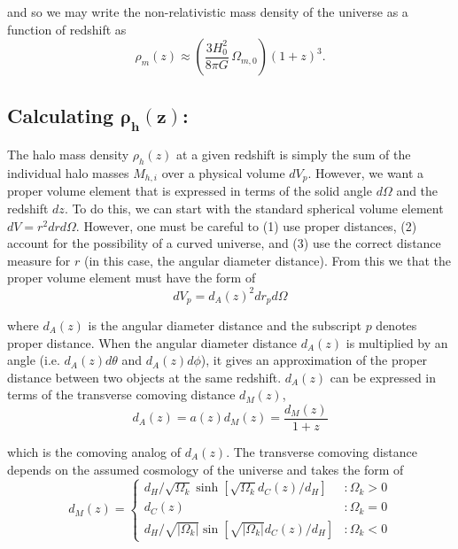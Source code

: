 \documentclass[%
 reprint,
 amsmath,amssymb,
 aps,nofootinbib
]{revtex4-1}
\begin{document}
\noindent and so we may write the non-relativistic mass density of the universe as a function of redshift as
\begin{equation}\label{rho}
\rho_m(z)\approx\left(\frac{3H_0^2}{8\pi G}\,\Omega_{m,0}\right)(1+z)^3.
\end{equation}

\subsection*{Calculating $\mathbf{\rho_h(z)}$:}

The halo mass density $\rho_h(z)$ at a given redshift is simply the sum of the individual halo masses $M_{h,i}$ over a physical volume $dV_p$. However, we want a proper volume element that is expressed in terms of the solid angle $d\Omega$ and the redshift $dz$. To do this, we can start with the standard spherical volume element $dV=r^2drd\Omega$. However, one must be careful to (1) use proper distances, (2) account for the possibility of a curved universe, and (3) use the correct distance measure for $r$ (in this case, the angular diameter distance). From this we that the proper volume element must have the form of
\begin{equation}\label{proper_element}
dV_p=d_A(z)^2dr_pd\Omega
\end{equation}

\noindent where $d_A(z)$ is the angular diameter distance and the subscript $p$ denotes proper distance. When the angular diameter distance $d_A(z)$ is multiplied by an angle (i.e. $d_A(z)d\theta$ and $d_A(z)d\phi$), it gives an approximation of the proper distance between two objects at the same redshift. $d_A(z)$ can be expressed in terms of the transverse comoving distance $d_M(z)$,
\begin{equation}\label{angular2transverse}
d_A(z)=a(z)d_M(z)=\frac{d_M(z)}{1+z}
\end{equation}

\noindent which is the comoving analog of $d_A(z)$. The transverse comoving distance depends on the assumed cosmology of the universe and takes the form of
\begin{equation}\label{comoving_transverse}
d_M(z)=\left\{
     \begin{array}{lr}
       d_H/\sqrt{\Omega_k}\sinh\left[\sqrt{\Omega_k}d_C(z)/d_H\right] & : \Omega_k>0\\
       d_C(z) & : \Omega_k=0\\
       d_H/\sqrt{|\Omega_k|}\sin\left[\sqrt{|\Omega_k|}d_C(z)/d_H\right] & : \Omega_k<0
     \end{array}
   \right.
\end{equation}
\end{document}
